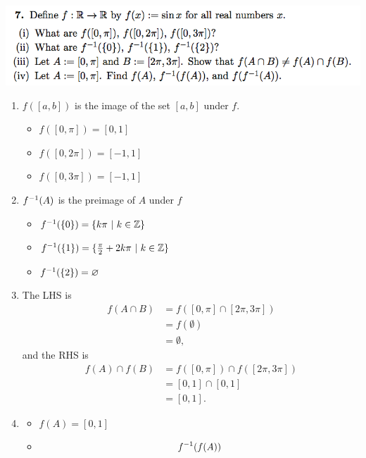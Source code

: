 \documentclass[12pt]{article}
\begin{document}
\newpage
\subsection*{} %
\includegraphics[width=400pt]{img/iulm-1-7.png}
\begin{mdframed}
  \begin{enumerate}[label=(\roman*)]
  \item $f([a,b])$ is the image of the set $[a,b]$ under $f$.
    \begin{itemize}
    \item $f([0, \pi]) = [0, 1]$
    \item $f([0, 2\pi]) = [-1, 1]$
    \item $f([0, 3\pi]) = [-1, 1]$
    \end{itemize}
  \item $f^{-1}(A)$ is the preimage of $A$ under $f$
    \begin{itemize}
    \item $f^{-1}(\{0\}) = \{k\pi~|~k \in \mathbb{Z}\}$
    \item $f^{-1}(\{1\}) = \{\frac{\pi}{2} + 2k\pi ~|~ k \in \mathbb{Z}\}$
    \item $f^{-1}(\{2\}) = \varnothing$
    \end{itemize}
  \item The LHS is
    \begin{align*}
      f(A \cap B)
      &= f([0, \pi] \cap [2\pi,3\pi])\\
      &= f(\emptyset)\\
      &= \emptyset,
    \end{align*}
    and the RHS is
    \begin{align*}
      f(A) \cap f(B)
      &= f([0, \pi]) \cap f([2\pi,3\pi])\\
      &= [0, 1] \cap [0, 1]\\
      &= [0, 1].
    \end{align*}
  \item
    \begin{itemize}
    \item $f(A) = [0, 1]$
    \item
      \begin{align*}
        f^\1(f(A))

\end{align*}
\end{itemize}
\end{enumerate}
\end{mdframed}
\end{document}
